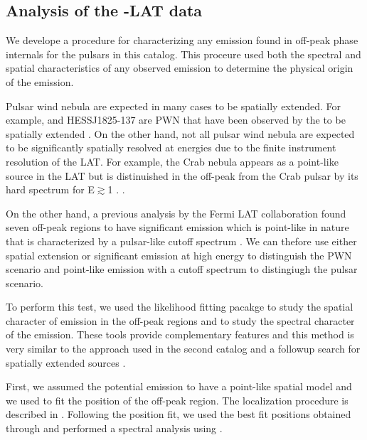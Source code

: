 \subsection{Analysis of the \fermi-LAT data}

We develope a procedure for characterizing any emission found
in off-peak phase internals for the pulsars in this catalog.  
This proceure used both the spectral and spatial characteristics
of any observed emission to determine the physical origin of the emission.

Pulsar wind nebula are expected in many cases to be spatially
extended. For example, \velax and HESS\;J1825-137 are PWN
that have been observed by the \lat to be spatially extended
\citep{LAT_collaboration_Vela_X_2010,LAT_collaboration_HESS_J1825_2011}.
On the other hand, not all pulsar wind nebula are expected to be
significantly spatially resolved at \gev energies due to the finite
instrument resolution of the LAT. For example, the Crab nebula appears
as a point-like source in the LAT but is distinuished in the off-peak
from the Crab pulsar by its hard spectrum for E$\gtrsim$1 \gev.
\citep{LAT_collaboration_crab_2010}.

On the other hand, a previous analysis by the Fermi LAT collaboration
found seven off-peak regions to have significant emission which is
point-like in nature that is characterized by a pulsar-like cutoff
spectrum \citep{LAT_collaboration_PWNCAT_2011}.  We can thefore use
either spatial extension or significant emission at high energy to
distinguish the PWN scenario and point-like emission with a cutoff
spectrum to distingiugh the pulsar scenario.

To perform this test, we used the likelihood fitting pacakge \pointlike to study
the spatial character of emission in the off-peak regions and \gtlike to
study the spectral character of the emission. These tools provide complementary
features and this method is very similar to the approach used in the
second \lat catalog \citep{LAT_Collaboration_2FGL_2012}
and a followup search for spatially extended sources 
\citep{LAT_collaboration_extended_search_2012}.

First, we assumed the potential emission to have a point-like spatial model
and we used \pointlike to fit the position of 
the off-peak region. The localization procedure is described in \cite{LAT_Collaboration_2FGL_2012}. 
Following the position fit, we used the best fit positions
obtained through \pointlike and performed a spectral analysis using \gtlike.


